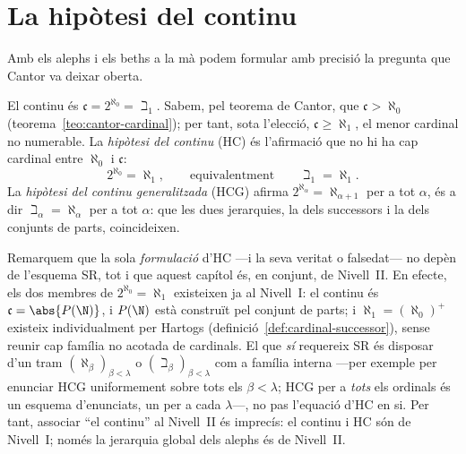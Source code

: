 \section{La hipòtesi del continu}\label{sec:hipotesi-continu}

Amb els alephs i els beths a la mà podem formular amb precisió la pregunta que
Cantor va deixar oberta.

\begin{observacio}\label{obs:hipotesi-continu}
El continu és \(\mathfrak c=2^{\aleph_0}=\beth_1\). Sabem, pel teorema de Cantor,
que \(\mathfrak c>\aleph_0\) (teorema~\ref{teo:cantor-cardinal}); per tant, sota
l'elecció, \(\mathfrak c\ge\aleph_1\), el menor cardinal no numerable. La
\emph{hipòtesi del continu} (HC) és l'afirmació que no hi ha cap cardinal entre
\(\aleph_0\) i \(\mathfrak c\):
\[
2^{\aleph_0}=\aleph_1,
\qquad\text{equivalentment}\qquad
\beth_1=\aleph_1 .
\]
La \emph{hipòtesi del continu generalitzada} (HCG) afirma \(2^{\aleph_\alpha}=\aleph_{\alpha+1}\)
per a tot \(\alpha\), és a dir \(\beth_\alpha=\aleph_\alpha\) per a tot \(\alpha\):
que les dues jerarquies, la dels successors i la dels conjunts de parts,
coincideixen.
\end{observacio}

\begin{observacio}[HC no necessita SR]\label{obs:hc-sense-sr}
Remarquem que la sola \emph{formulació} d'HC ---i la seva veritat o
falsedat--- no depèn de l'esquema SR, tot i que aquest capítol és, en conjunt,
de Nivell~II. En efecte, els dos membres de \(2^{\aleph_0}=\aleph_1\) existeixen
ja al Nivell~I: el continu és \(\mathfrak c=\abs{P(\N)}\), i \(P(\N)\) està
construït pel conjunt de parts; i \(\aleph_1=(\aleph_0)^{+}\) existeix
individualment per Hartogs (definició~\ref{def:cardinal-successor}), sense
reunir cap família no acotada de cardinals. El que \emph{sí} requereix SR és
disposar d'un tram \((\aleph_\beta)_{\beta<\lambda}\) o
\((\beth_\beta)_{\beta<\lambda}\) com a família interna ---per exemple per
enunciar HCG uniformement sobre tots els \(\beta<\lambda\); HCG per a
\emph{tots} els ordinals és un esquema d'enunciats, un per a cada
\(\lambda\)---, no pas l'equació d'HC en si. Per
tant, associar \enquote{el continu} al Nivell~II és imprecís: el continu i HC
són de Nivell~I; només la jerarquia global dels alephs és de Nivell~II.
\end{observacio}

